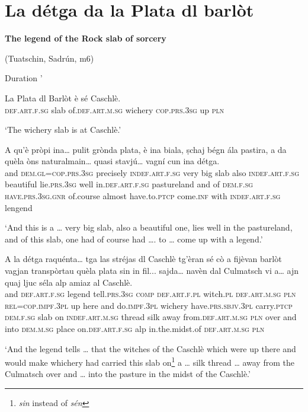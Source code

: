 \section{La détga da la Plata dl barlòt}


\textbf{The legend of the Rock slab of sorcery}

\noindent
(Tuatschin, Sadrún, m6)

\noindent
Duration '
\bigskip

\begin{linenumbers}
\gll    La Plata dl Barlòt è sé Caschlè.
\\
 \textsc{def.art.f.sg} slab of.\textsc{def.art.m.sg} wichery \textsc{cop.prs.3sg} up \textsc{pln}\\
\end{linenumbers}
\medskip
\glt `The wichery slab is at Caschlè.'
\medskip

\begin{linenumbers}
\gll    A qu’è pròpi ina… pulit grònda plata, è ina biala, ṣchaj bégn ála pastira, a da quèla òns naturalmain… quasi stavjú… vagní cun ina détga.\\
 and \textsc{dem.gl=cop.prs.3sg} precisely \textsc{indef.art.f.sg} very big slab also \textsc{indef.art.f.sg} beautiful lie.\textsc{prs.3sg} well  in.\textsc{def.art.f.sg} pastureland and of \textsc{dem.f.sg} \textsc{have.prs.3sg.gnr} of.course almost have.to.\textsc{ptcp}  come.\textsc{inf} with \textsc{indef.art.f.sg} lengend\\
\end{linenumbers}
\medskip
\glt `And this is a … very big slab, also a beautiful one, lies well in the pastureland, and of this slab, one had of course had …. to … come up with a legend.'
\medskip

\begin{linenumbers}
\gll    A la détga raquénta… tga las stréjas dl Caschlè tg’èran sé cò a fijèvan barlòt vagjan transpòrtau quèla plata sin in fil... sajda… navèn dal Culmatsch vi a… ajn quaj ljuc séla alp amiaz al Caschlè.\\
and \textsc{def.art.f.sg} legend tell.\textsc{prs.3sg} \textsc{comp} \textsc{def.art.f.pl} witch.\textsc{pl} \textsc{def.art.m.sg} \textsc{pln} \textsc{rel=cop.impf.3pl} up here and do.\textsc{impf.3pl} wichery have.\textsc{prs.sbjv.3pl} carry.\textsc{ptcp} \textsc{dem.f.sg} slab on \textsc{indef.art.m.sg} thread silk away from.\textsc{def.art.m.sg} \textsc{pln} over and  into \textsc{dem.m.sg} place on.\textsc{def.art.f.sg} alp in.the.midst.of \textsc{def.art.m.sg} \textsc{pln}\\
\end{linenumbers}
\medskip
\glt `And the legend tells … that the witches of the Caschlè which were up there and would make whichery had carried this slab on\footnote{\textit{sin} instead of \textit{sén}} a … silk thread … away from the Culmatsch over and … into the pasture in the midst of the Caschlè.'
\medskip

